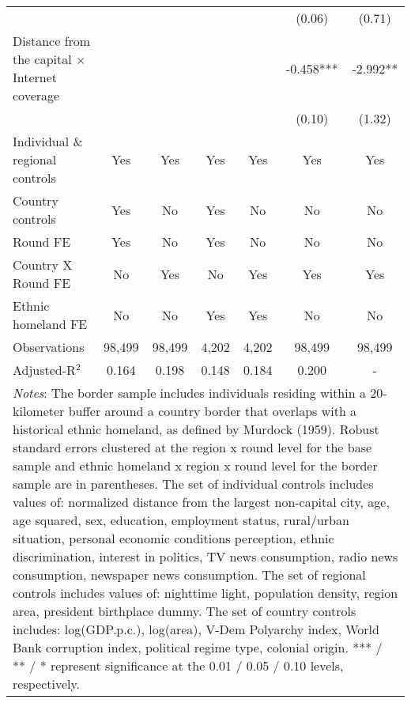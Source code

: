 \documentclass[11pt]{article}
\theoremstyle{plain}
\theoremstyle{plain}
\begin{document}
\begin{table}[H]
{\begin{tabular}{@{\extracolsep{5pt}} l c c c c c c}
                 &&&&&      (0.06)   &      (0.71)\\
                 Distance from the capital $\times$ Internet coverage &&&&&      -0.458***&-2.992**\\
                 \medskip
                 &&&&&      (0.10) & (1.32)\\
                 \midrule
                 \smallskip
                Individual \& regional controls  & Yes & Yes & Yes & Yes& Yes & Yes  \\
                \smallskip
                Country controls & Yes& No& Yes& No& No& No\\
                \smallskip
                Round FE & Yes & No& Yes & No& No& No\\
                \smallskip
                Country X Round FE  & No & Yes& No & Yes& Yes& Yes\\
                \smallskip
                Ethnic homeland FE & No & No & Yes& Yes& No& No\\
                \smallskip
                Observations           &   98,499   &       98,499   &        4,202   &        4,202   & 98,499   &       98,499 \\
                Adjusted-R$^2$        &        0.164   &       0.198   &       0.148   &       0.184  & 0.200   &       - \\
            
                                      \bottomrule
                \multicolumn{7}{p{20cm}}{\footnotesize \emph{Notes}: The border sample includes individuals residing within a 20-kilometer buffer around a country border that overlaps with a historical ethnic homeland, as defined by Murdock (1959). Robust standard errors clustered at the region x round level  for the base sample and ethnic homeland x region x round level for the border sample are in parentheses. The set of individual controls
                includes values of: normalized distance from the largest non-capital city, age, age squared, sex,
                education, employment status, rural/urban situation, personal economic conditions perception, ethnic discrimination, interest in politics, TV news consumption, radio news consumption, newspaper news consumption. The set of regional controls includes values of: nighttime light, population density, region area, president birthplace dummy. The set of country controls includes: log(GDP.p.c.), log(area), V-Dem Polyarchy index, World Bank corruption index, political regime type, colonial origin. *** / ** / * represent significance at the 0.01 / 0.05 / 0.10 levels, respectively.}
                \end{tabular}
                }
                \end{table}
\end{document}
